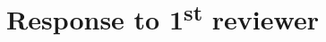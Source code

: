 \documentclass{article}
\newcommand\st{\textsuperscript{st}\xspace}
\begin{document}








\section{Response to 1\st reviewer}
\end{document}
